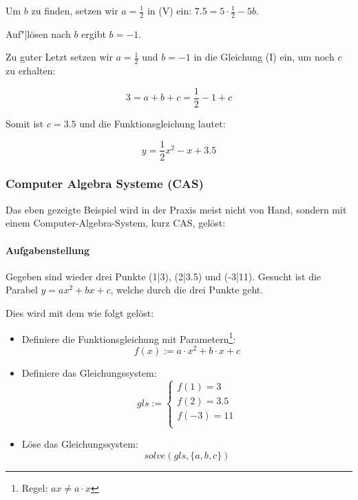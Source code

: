 Um $b$ zu finden, setzen wir $a = \frac{1}{2}$ in (V) ein: $7.5 =
5\cdot{}\frac{1}{2} - 5b$.

Auf"|lösen nach $b$ ergibt $b = -1$.

Zu guter Letzt setzen wir $a = \frac{1}{2}$ und $b=-1$ in die
Gleichung (I) ein, um noch $c$ zu erhalten:

$$3 = a + b + c = \frac{1}{2} - 1 + c$$

Somit ist $c=3.5$ und die Funktionsgleichung lautet:

$$y = \frac{1}{2}x^2 - x + 3.5$$


\newpage


\subsubsection{Computer Algebra Systeme (CAS)}
Das eben gezeigte Beispiel wird in der Praxis meist nicht von Hand,
sondern mit einem Computer-Algebra-System, kurz CAS, gelöst:

\paragraph{Aufgabenstellung}
Gegeben sind wieder drei Punkte (1|3), (2|3.5) und (-3|11).
Gesucht ist die Parabel $y = ax^2 + bx + c$, welche durch die drei
Punkte geht.

Dies wird mit dem \tinspire{} wie folgt gelöst:
\begin{itemize}
\item Definiere die Funktionsgleichung mit
  Parametern\footnote{\tinspire Regel: $ax\ne a\cdot{} x$}:\\
  $$f(x) := a\cdot{}x^2 + b\cdot{}x + c$$
\item Definiere das Gleichungssystem:
  $$gls := \left\{ \begin{array}{l}
    f(1) = 3\\
    f(2) = 3.5\\
    f(-3)= 11\\
  \end{array}\right.$$
\item Löse das Gleichungssystem:
  $$solve(gls,\{a, b, c\})$$
\end{itemize}

